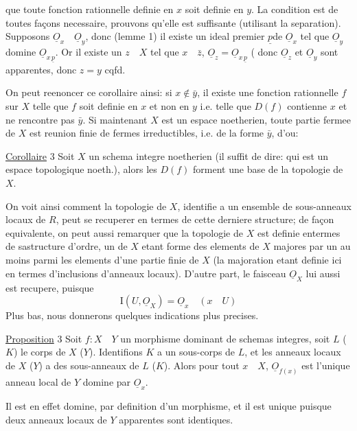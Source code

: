 que toute fonction rationnelle definie en $x$ soit definie en $y$.  La condition est de toutes façons necessaire, prouvons qu'elle est suffisante (utilisant la separation). Supposons $\underline O_x\quad\underline O_y$, donc (lemme 1) il existe un ideal premier $\underline p$de $\underline O_x$ tel que $\underline O_y$ domine $\underline O_{x\,\underline p}$. Or il existe un $z\quad X$ tel que $x\quad\bar z$, $\underline O_z=\underline O_{x\,\underline p}$ (
donc $\underline O_z$ et $\underline O_y$ sont apparentes, donc $z=y$ cqfd.

On peut reenoncer ce corollaire ainsi: si $x\notin\bar y$, il existe une fonction rationnelle $f$ sur $X$ telle que $f$ soit definie en $x$ et non en $y$ i.e. telle que $D(f)$ contienne $x$ et ne rencontre pas $\bar y$. Si maintenant $X$ est un espace noetherien, toute partie fermee de $X$ est reunion finie de fermes irreductibles, i.e. de la forme $\bar y$, d'ou:

\uline{Corollaire} 3 Soit $X$ un schema integre noetherien (il suffit de dire: qui est un espace topologique noeth.), alors les $D(f)$ forment une base de la topologie de $X$.

On voit ainsi comment la topologie de $X$, identifie a un ensemble de sous-anneaux locaux de $R$, peut se recuperer en termes de cette derniere structure; de façon equivalente, on peut aussi remarquer que la topologie de $X$ est definie entermes de sastructure d'ordre, un  de $X$ etant forme des elements de $X$ majores par un au moins parmi les elements d'une partie finie de $X$ (la majoration etant definie  ici en termes d'inclusions  d'anneaux locaux). D'autre part, le faisceau $\underline O_X$ lui aussi est recupere, puisque
\[
\mathrm I(U,\underline O_X)=\underline O_x\quad(x\quad U)
\]
Plus bas, nous donnerons quelques indications plus precises.

\uline{Proposition} 3 Soit $f:X\quad Y$ un morphisme dominant de schemas integres,  soit $L$ ($K$) le corps de $X$ ($Y$). Identifions $K$ a un sous-corps de $L$, et les anneaux locaux de $X$ ($Y$) a des sous-anneaux de $L$ ($K$). Alors pour tout $x\quad X$, $\underline O_{f(x)}$ est l'unique anneau local de $Y$ domine par $\underline O_x$.

Il est en effet domine, par definition d'un morphisme, et il est unique puisque deux anneaux locaux de $Y$ apparentes sont identiques.

